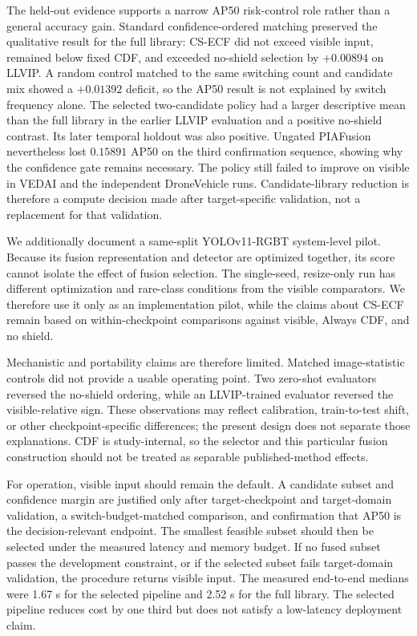 \documentclass[preprint,11pt]{elsarticle}
\begin{document}
The held-out evidence supports a narrow AP50 risk-control role rather than a
general accuracy gain. Standard confidence-ordered matching preserved the
qualitative result for the full library: CS-ECF did not exceed visible input,
remained below fixed CDF, and exceeded no-shield selection by \(+0.00894\) on
LLVIP. A random control matched to the same switching count and candidate mix
showed a \(+0.01392\) deficit, so the AP50 result is not explained by switch
frequency alone. The selected two-candidate policy had a larger descriptive
mean than the full library in the earlier LLVIP evaluation and a positive
no-shield contrast. Its later temporal holdout was also positive. Ungated
PIAFusion nevertheless lost \(0.15891\) AP50 on the third confirmation
sequence, showing why the confidence gate remains necessary. The policy still
failed to improve on visible in VEDAI and the independent DroneVehicle runs.
Candidate-library reduction is therefore a compute decision made after
target-specific validation, not a replacement for that validation.

We additionally document a same-split YOLOv11-RGBT system-level pilot. Because
its fusion representation and detector are optimized together,
its score cannot isolate the effect of fusion selection. The single-seed,
resize-only run has different optimization and rare-class conditions from the
visible comparators. We therefore use it only as an implementation pilot,
while the claims about CS-ECF remain based on within-checkpoint comparisons
against visible, Always CDF, and no shield.

Mechanistic and portability claims are therefore limited. Matched
image-statistic controls did not provide a usable operating point. Two
zero-shot evaluators reversed the no-shield ordering, while an LLVIP-trained
evaluator reversed the visible-relative sign. These observations may reflect
calibration, train-to-test shift, or other checkpoint-specific differences;
the present design does not separate those explanations. CDF is study-internal,
so the selector and this particular fusion construction should not be treated
as separable published-method effects.

For operation, visible input should remain the default. A candidate subset and
confidence margin are justified only after target-checkpoint and
target-domain validation, a switch-budget-matched comparison, and confirmation
that AP50 is the decision-relevant endpoint. The smallest feasible subset
should then be selected under the measured latency and memory budget. If no
fused subset passes the development constraint, or if the selected subset
fails target-domain validation, the procedure returns visible input. The
measured end-to-end medians were 1.67 s for the selected pipeline and 2.52 s
for the full library. The selected pipeline reduces cost by one third but does
not satisfy a low-latency deployment claim.
\end{document}
